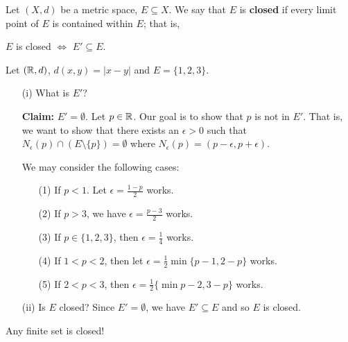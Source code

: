 \documentclass[a4paper]{report}
\begin{document}
\begin{definition}
    Let \( (X,d)  \) be a metric space, \( E \subseteq  X  \). We say that \( E  \) is \textbf{closed} if every limit point of \( E  \) is contained within \( E  \); that is,
    \begin{center}
        \( E  \) is closed \( \Longleftrightarrow  \)  \( E' \subseteq  E  \).
    \end{center}
\end{definition}

\begin{eg}
    Let \( (\mathbb{R},d) \), \( d(x,y) = | x - y  |  \) and \( E = \{ 1,2,3 \}  \).
    \begin{enumerate}
        \item[(i)] What is \( E' \)?
          
            \textbf{Claim:} \( E' = \emptyset \). Let \( p \in \mathbb{R}  \). Our goal is to show that \( p  \) is not in \( E' \). That is, we want to show that there exists an \( \epsilon >  0  \) such that \( {N}_{\epsilon}(p) \cap (E \setminus  \{ p \} )  = \emptyset \)
          where \( {N}_{\epsilon}(p) = (p - \epsilon, p + \epsilon) \).

          We may consider the following cases:
          \begin{enumerate}
              \item[(1)] If \( p < 1  \). Let \( \epsilon = \frac{ 1 - p }{ 2 }  \) works. 
               \item[(2)] If \( p > 3  \), we have \( \epsilon = \frac{ p - 3  }{ 2  }   \) works.
                \item[(3)] If \( p \in \{ 1,2,3 \}  \), then \( \epsilon = \frac{ 1 }{ 4 }  \) works.
                \item[(4)] If \( 1 < p < 2  \), then let \( \epsilon = \frac{ 1 }{ 2 }  \min \{ p - 1 , 2 - p \}   \) works. 
            \item[(5)] If \( 2 < p < 3   \), then \( \epsilon = \frac{ 1 }{ 2 } \{  \min p - 2 , 3 -p \}   \) works.
          \end{enumerate}
        \item[(ii)] Is \( E  \) closed?
            Since \( E' = \emptyset \), we have \( E' \subseteq E  \) and so \( E  \) is closed.
    \end{enumerate}
\end{eg}

\begin{remark}
    Any finite set is closed!
\end{remark}
\end{document}
